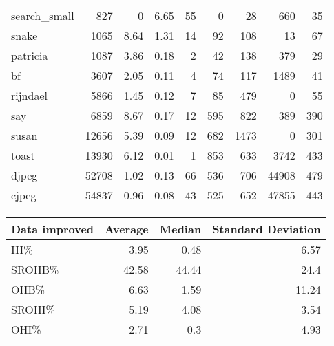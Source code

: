 \begin{tabular}{lrrrrrrrr}
 search\_small   &            827 &     0    &   6.65 &   55 &      0 &           28 &   660 &    35 \\
 snake          &           1065 &     8.64 &   1.31 &   14 &     92 &          108 &    13 &    67 \\
 patricia       &           1087 &     3.86 &   0.18 &    2 &     42 &          138 &   379 &    29 \\
 bf             &           3607 &     2.05 &   0.11 &    4 &     74 &          117 &  1489 &    41 \\
 rijndael       &           5866 &     1.45 &   0.12 &    7 &     85 &          479 &     0 &    55 \\
 say            &           6859 &     8.67 &   0.17 &   12 &    595 &          822 &   389 &   390 \\
 susan          &          12656 &     5.39 &   0.09 &   12 &    682 &         1473 &     0 &   301 \\
 toast          &          13930 &     6.12 &   0.01 &    1 &    853 &          633 &  3742 &   433 \\
 djpeg          &          52708 &     1.02 &   0.13 &   66 &    536 &          706 & 44908 &   479 \\
 cjpeg          &          54837 &     0.96 &   0.08 &   43 &    525 &          652 & 47855 &   443 \\
\hline
\end{tabular}\begin{tabular}{lrrr}
\hline
 Data improved   &   Average &   Median &   Standard Deviation \\
\hline
 III\%            &      3.95 &     0.48 &                 6.57 \\
 SROHB\%          &     42.58 &    44.44 &                24.4  \\
 OHB\%            &      6.63 &     1.59 &                11.24 \\
 SROHI\%          &      5.19 &     4.08 &                 3.54 \\
 OHI\%            &      2.71 &     0.3  &                 4.93 \\
\hline
\end{tabular}